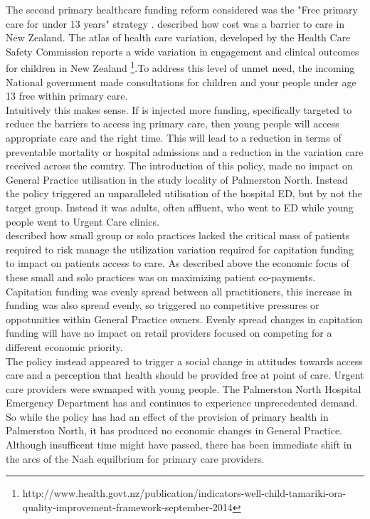 \documentclass[11pt,a4paper]{article}
\begin{document}
The second primary healthcare funding reform considered was the "Free primary care for under 13 years" strategy \citep{frizelle2014health}. \citet{schoen2009survey} described how cost was a barrier to care in New Zealand. The atlas of health care variation, developed by the Health Care Safety Commission reports a wide variation in engagement and clinical outcomes for children in New Zealand \footnote{http://www.health.govt.nz/publication/indicators-well-child-tamariki-ora-quality-improvement-framework-september-2014}.To address this level of unmet need, the incoming National government made consultations for children and your people under age 13 free within primary care\citep{frizelle2014health}. \\

Intuitively this makes sense. If is injected more funding, specifically targeted to reduce the barriers to access ing primary care, then young people will access appropriate care and the right time. This will lead to a reduction in terms of preventable mortality or hospital admissions and a reduction in the variation care received across the country. The introduction of this policy, made no impact on General Practice utilisation in the study locality of Palmerston North. Instead the policy triggered an unparalleled utilisation of the hospital ED, but by not the target group. Instead it was adults, often affluent, who went to ED while young people went to Urgent Care clinics.\\

\citet{howell2005restructuring} described how small group or solo practices lacked the critical mass of patients required to risk manage the utilization variation required for capitation funding to impact on patients access to care. As described above the economic focus of these small and solo practices was on maximizing patient co-payments. Capitation funding was evenly spread between all practitioners, this increase in funding was also spread evenly, so triggered no competitive pressures or oppotunities within General Practice owners. Evenly spread changes in capitation funding will have no impact on retail providers focused on competing for a different economic priority.\\

The policy instead appeared to trigger a social change in attitudes towards access care and a perception that health should be provided free at point of care. Urgent care providers were swmaped with young people. The Palmerston North Hospital Emergency Department has and continues to experience unprecedented demand. So while the policy has had an effect of the provision of primary health in Palmerston North, it has produced no economic changes in General Practice. Although insufficent time might have passed, there has been immediate shift in the arcs of the Nash equilbrium for primary care providers.\\
\end{document}
